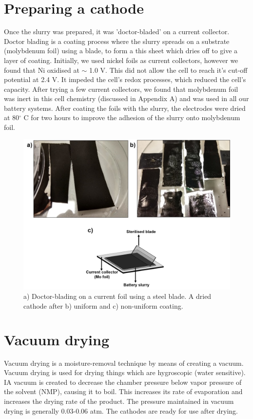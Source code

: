 \section{Preparing a cathode}
Once the slurry was prepared, it was 'doctor-bladed' on a current collector. Doctor blading is a coating process where the slurry spreads on a substrate (molybdenum foil)  using a blade, to form a this sheet which dries off to give a layer of coating.  Initially, we used nickel foils as current collectors, however we found that Ni oxidised at $\sim$ 1.0 V. This did not allow the cell to reach it's cut-off potential at 2.4 V. It impeded the cell's redox processes, which reduced the cell's capacity. After trying a few current collectors, we found that molybdenum foil was inert in this cell chemistry (discussed in Appendix A) and was used in all our battery systems. After coating the foils with the slurry, the electrodes were dried at 80$^{\circ}$ C for two hours to improve the adhesion of the slurry onto molybdenum foil. 

\begin{figure}[tbh!]
\centering
\includegraphics[width=\textwidth]{Figures/chap3fig/coating}
\caption{a) Doctor-blading on a current foil using a steel blade. A dried cathode after b) uniform and c) non-uniform coating.}
\label{Figures/chap3fig:coating}
\end{figure}

\section{Vacuum drying}
Vacuum drying is a moisture-removal technique by means of creating a vacuum. Vacuum drying is used for drying things which are hygroscopic (water sensitive). IA vacuum is created to decrease the chamber pressure below vapor pressure of the solvent (NMP), causing it to boil. This increases its rate of evaporation and increases the drying rate of the product. The pressure maintained in vacuum drying is generally 0.03-0.06 atm. The cathodes are ready for use after drying. 


